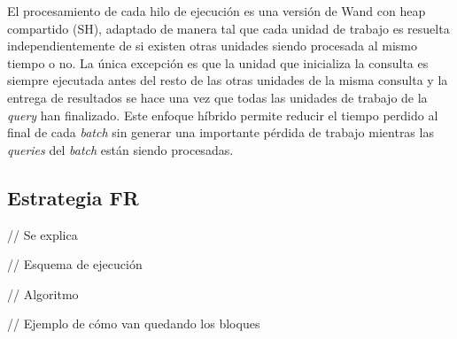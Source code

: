 El procesamiento de cada hilo de ejecución es una versión de Wand con heap compartido (SH), adaptado de manera tal que cada unidad de trabajo es resuelta independientemente de si existen otras unidades siendo procesada al mismo tiempo o no. La única excepción es que la unidad que inicializa la consulta es siempre ejecutada antes del resto de las otras unidades de la misma consulta y la entrega de resultados se hace una vez que todas las unidades de trabajo de la \textit{query} han finalizado. Este enfoque híbrido permite reducir el tiempo perdido al final de cada \textit{batch} sin generar una importante pérdida de trabajo mientras las \textit{queries} del \textit{batch} están siendo procesadas.


\subsection{Estrategia FR}
\label{scheduling:fr}

// Se explica

// Esquema de ejecución

// Algoritmo

// Ejemplo de cómo van quedando los bloques


